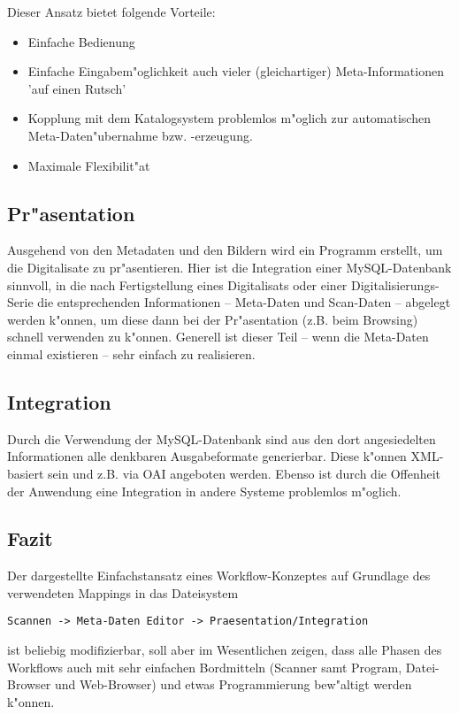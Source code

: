 \documentclass[11pt, twoside, a4paper, BCOR8mm, DIV12, bibtotoc,idxtotoc]{scrreprt}
\begin{document}
Dieser Ansatz bietet folgende Vorteile:
\begin{itemize}
\item Einfache Bedienung
\item Einfache Eingabem"oglichkeit auch vieler (gleichartiger)
Meta-Informationen 'auf einen Rutsch'
\item Kopplung mit dem Katalogsystem problemlos m"oglich zur
automatischen Meta-Daten\-"uber\-nahme bzw. -er\-zeugung.
\item Maximale Flexibilit"at
\end{itemize}


\subsection{Pr"asentation}
Ausgehend von den Metadaten und den Bildern wird ein Programm
erstellt, um die Digitalisate zu pr"asentieren. Hier ist die
Integration einer MySQL-Datenbank sinnvoll, in die nach Fertigstellung
eines Digitalisats oder einer Digitalisie\-rungs-Serie die
entsprechenden Informationen -- Meta-Daten und Scan-Daten -- abgelegt
werden k"onnen, um diese dann bei der Pr"asentation (z.B. beim
Browsing) schnell verwenden zu k"onnen. Generell ist dieser Teil --
wenn die Meta-Daten einmal existieren -- sehr einfach zu realisieren.

\subsection{Integration}
Durch die Verwendung der MySQL-Datenbank sind aus den dort
angesiedelten Informationen alle denkbaren Ausgabeformate
generierbar. Diese k"onnen XML-basiert sein und z.B. via OAI angeboten
werden. Ebenso ist durch die Offenheit der Anwendung eine Integration
in andere Systeme problemlos m"oglich.

\subsection{Fazit}
Der dargestellte Einfachstansatz eines Workflow-Konzeptes auf
Grundlage des verwendeten Map\-pings in das Dateisystem
\begin{verbatim}
Scannen -> Meta-Daten Editor -> Praesentation/Integration
\end{verbatim}
ist beliebig modifizierbar, soll aber im Wesentlichen zeigen, dass
alle Phasen des Workflows auch mit sehr einfachen Bordmitteln (Scanner
samt Program, Datei-Browser und Web-Browser) und etwas Programmierung
bew"altigt werden k"onnen.
\end{document}
